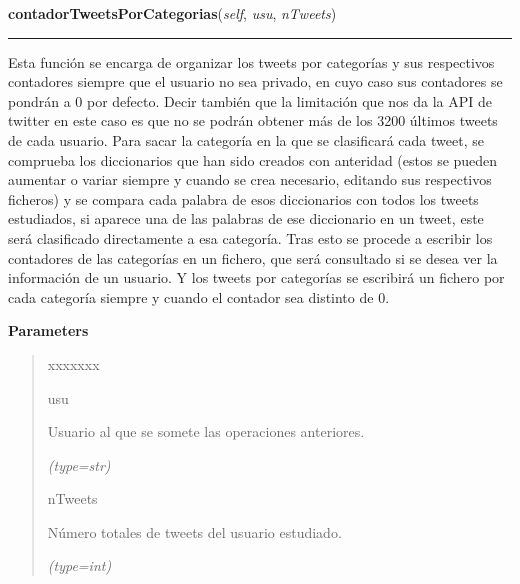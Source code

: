 \hspace{.8\funcindent}\begin{boxedminipage}{\funcwidth}

    \raggedright \textbf{contadorTweetsPorCategorias}(\textit{self}, \textit{usu}, \textit{nTweets})

    \vspace{-1.5ex}

    \rule{\textwidth}{0.5\fboxrule}
\setlength{\parskip}{2ex}
    Esta función se encarga de organizar los tweets por categorías y sus 
    respectivos contadores siempre que el usuario no sea privado, en cuyo 
    caso sus contadores se pondrán a 0 por defecto. Decir también que la 
    limitación que nos da la API de twitter en este caso es que no se 
    podrán obtener más de los 3200 últimos tweets de cada usuario. Para 
    sacar la categoría en la que se clasificará cada tweet, se comprueba 
    los diccionarios que han sido creados con anteridad (estos se pueden 
    aumentar o variar siempre y cuando se crea necesario, editando sus 
    respectivos ficheros) y se compara cada palabra de esos diccionarios 
    con todos los tweets estudiados, si aparece una de las palabras de ese 
    diccionario en un tweet, este será clasificado directamente a esa 
    categoría. Tras esto se procede a escribir los contadores de las 
    categorías en un fichero, que será consultado si se desea ver la 
    información de un usuario. Y los tweets por categorías se escribirá un 
    fichero por cada categoría siempre y cuando el contador sea distinto de
    0.

\setlength{\parskip}{1ex}
      \textbf{Parameters}
      \vspace{-1ex}

      \begin{quote}
        \begin{Ventry}{xxxxxxx}

          \item[usu]

          Usuario al que se somete las operaciones anteriores.

            {\it (type=str)}

          \item[nTweets]

          Número totales de tweets del usuario estudiado.

            {\it (type=int)}

        \end{Ventry}

      \end{quote}

    \end{boxedminipage}

